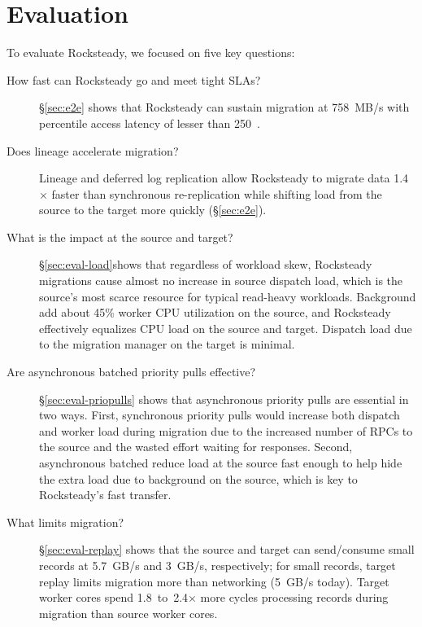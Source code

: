 \section{Evaluation}
\label{sec:reval}

To evaluate Rocksteady, we focused on five key questions:
\begin{description}
\item[How fast can Rocksteady go and meet tight SLAs?]
  \S\ref{sec:e2e} shows that Rocksteady can sustain migration at
    758~MB/s with \nnnth percentile access latency of lesser than 250~\us.
\item[Does lineage accelerate migration?]
  Lineage and deferred log replication allow Rocksteady to migrate data
    1.4$\times$ faster than synchronous re-replication while shifting
    load from the source to the target more quickly (\S\ref{sec:e2e}).
\item[What is the impact at the source and target?]
  \S\ref{sec:eval-load}\linebreak{}shows that regardless of workload skew, Rocksteady
    migrations cause almost no increase in source dispatch load, which is the source's
    most scarce resource for typical read-heavy workloads. Background \pulls
    add about 45\% worker CPU utilization on the source, and Rocksteady
    effectively equalizes CPU load on the source and target.
    Dispatch load due to the migration manager on the target is minimal.
\item[Are asynchronous batched priority pulls effective?]
  \S\ref{sec:eval-priopulls} shows that asynchronous priority pulls are
    essential in two ways. First, synchronous priority pulls would increase both
    dispatch and worker load during migration due to the increased number of
    RPCs to the source and the wasted effort waiting for \priopull responses. Second,
    asynchronous batched \priopulls reduce load at the source fast enough to help
    hide the extra load due to background \pulls on the source, which is key to
    Rocksteady's fast transfer.
\item[What limits migration?]
  \S\ref{sec:eval-replay} shows that the source and target can send/consume
    small records at 5.7~GB/s and 3~GB/s, respectively; for small
    records,
    target replay limits migration more than
    networking (5~GB/s today).
    Target worker cores spend 1.8~to~2.4$\times$ more cycles
    processing records during migration than source worker cores.


\end{description}
